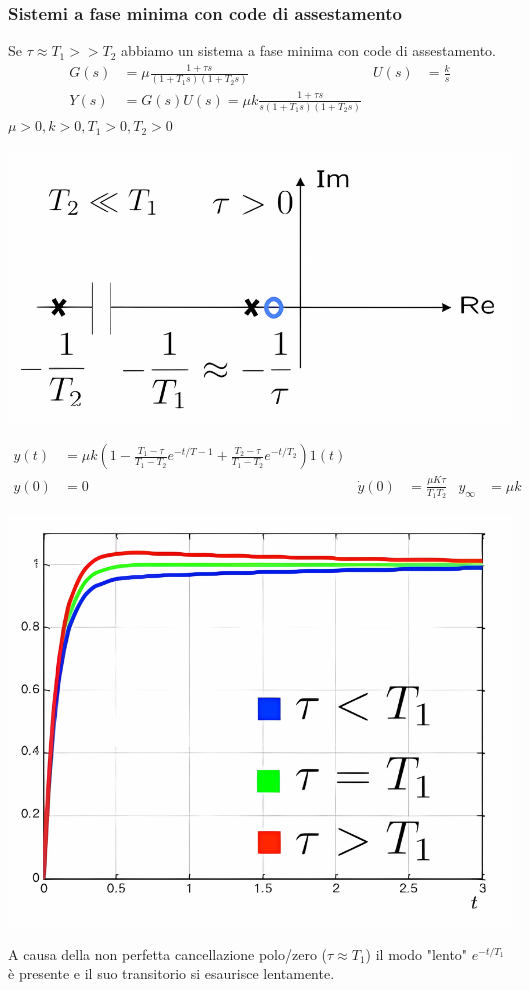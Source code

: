 \documentclass{article}
\numberwithin{equation}{subsection}
\begin{document}
\subsubsection{Sistemi a fase minima con code di assestamento}
Se  $\tau \approx T_1 >> T_2$ abbiamo un sistema a fase minima con code di assestamento.
\begin{align*}
    G(s) &= \mu\frac{1 + \tau s}{(1+T_1s)(1+T_2s)} & U(s) &= \frac{k}{s}\\
    Y(s) &= G(s)U(s) = \mu k \frac{1+ \tau s}{s(1+T_1s)(1+T_2s)}
\end{align*}
$\mu>0,k>0,T_1>0,T_2>0$
\begin{center}
    \includegraphics[scale=0.215]{Images/Fase_minima_code_ass_1.png}
\end{center}
\begin{align*}
    y(t) &= \mu k \left( 1 - \frac{T_1-\tau}{T_1-T_2} e^{-t/T-1} + \frac{T_2-\tau}{T_1-T_2}e^{-t/T_2} \right)1(t)\\
    y(0) &= 0 & \dot y(0) &= \frac{\mu K \tau}{T_1T_2} & y_{\infty} &= \mu k
\end{align*}
\begin{center}
    \includegraphics[scale=0.2]{Images/Fase_minima_code_ass_2.png}
\end{center}
A causa della non perfetta cancellazione polo/zero ($\tau \approx T_1$) il modo "lento" $e^{-t/T_1}$ è presente e il suo transitorio si esaurisce lentamente.
\end{document}
